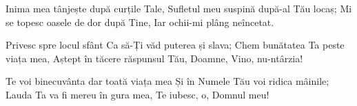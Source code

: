 \beginverse
Inima mea tânjește după curțile Tale,
Sufletul meu suspină după-al Tău locaș;
Mi se topesc oasele de dor după Tine,
Iar ochii-mi plâng neîncetat.
\endverse

\beginverse*
Privesc spre locul sfânt
Ca să-Ți văd puterea și slava;
Chem bunătatea Ta peste viața mea,
Aștept în tăcere răspunsul Tău, Doamne,
Vino, nu-ntârzia!
\endverse

\beginchorus
Te voi binecuvânta dar toată viața mea
Și în Numele Tău voi ridica mâinile;
Lauda Ta va fi mereu în gura mea,
Te iubesc, o, Domnul meu!
\endchorus
\endsong
